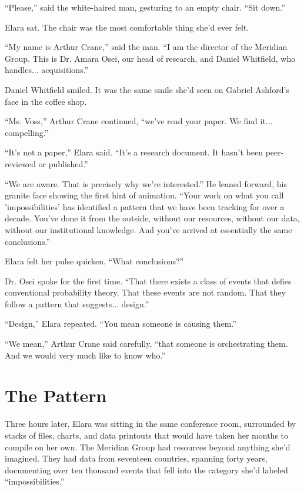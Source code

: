 \documentclass[
    language=english,
    doctype=novel,
    institution=none,
]{../../omnilatex}
\begin{document}
``Please,'' said the white-haired man, gesturing to an empty chair. ``Sit down.''

Elara sat. The chair was the most comfortable thing she'd ever felt.

``My name is Arthur Crane,'' said the man. ``I am the director of the Meridian Group. This is Dr. Amara Osei, our head of research, and Daniel Whitfield, who handles... acquisitions.''

Daniel Whitfield smiled. It was the same smile she'd seen on Gabriel Ashford's face in the coffee shop.

``Ms. Voss,'' Arthur Crane continued, ``we've read your paper. We find it... compelling.''

``It's not a paper,'' Elara said. ``It's a research document. It hasn't been peer-reviewed or published.''

``We are aware. That is precisely why we're interested.'' He leaned forward, his granite face showing the first hint of animation. ``Your work on what you call 'impossibilities' has identified a pattern that we have been tracking for over a decade. You've done it from the outside, without our resources, without our data, without our institutional knowledge. And you've arrived at essentially the same conclusions.''

Elara felt her pulse quicken. ``What conclusions?''

Dr. Osei spoke for the first time. ``That there exists a class of events that defies conventional probability theory. That these events are not random. That they follow a pattern that suggests... design.''

``Design,'' Elara repeated. ``You mean someone is causing them.''

``We mean,'' Arthur Crane said carefully, ``that someone is orchestrating them. And we would very much like to know who.''

\chapter{The Pattern}

Three hours later, Elara was sitting in the same conference room, surrounded by stacks of files, charts, and data printouts that would have taken her months to compile on her own. The Meridian Group had resources beyond anything she'd imagined. They had data from seventeen countries, spanning forty years, documenting over ten thousand events that fell into the category she'd labeled ``impossibilities.''
\end{document}
